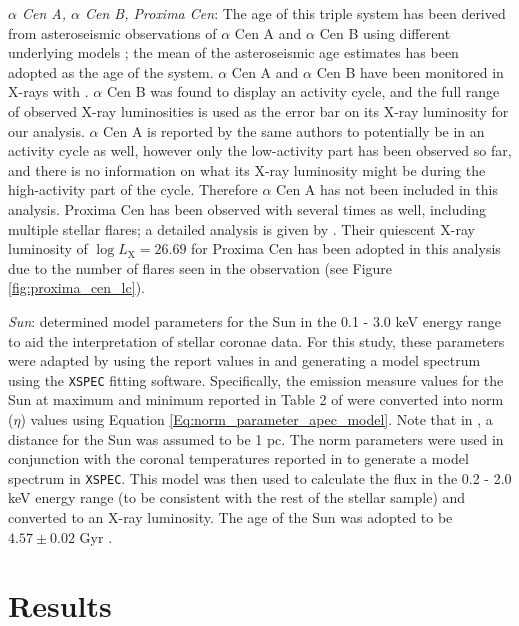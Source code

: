 \textit{$\alpha$ Cen A, $\alpha$ Cen B, Proxima Cen}: The age of this triple system has been derived from asteroseismic observations of $\alpha$ Cen A and $\alpha$ Cen B using different underlying models \citep{Miglio_Montalban_2005}; the mean of the asteroseismic age estimates has been adopted as the age of the system. $\alpha$ Cen A and $\alpha$ Cen B have been monitored in X-rays with \XMM \citep{Robrade_etal_2012}. $\alpha$ Cen B was found to display an activity cycle, and the full range of observed X-ray luminosities is used as the error bar on its X-ray luminosity for our analysis. $\alpha$ Cen A is reported by the same authors to potentially be in an activity cycle as well, however only the low-activity part has been observed so far, and there is no information on what its X-ray luminosity might be during the high-activity part of the cycle. Therefore $\alpha$ Cen A has not been included in this analysis. Proxima Cen has been observed with \XMM several times as well, including multiple stellar flares; a detailed analysis is given by \citet{Fuhrmeister_etal_2011}. Their quiescent X-ray luminosity of $\log L_{\mathrm{X}} = 26.69$ for Proxima Cen has been adopted in this analysis due to the number of flares seen in the observation (see Figure \ref{fig:proxima_cen_lc}).

\textit{Sun}: \citet{Peres_etal_2000} determined model parameters for the Sun in the 0.1 - 3.0 keV energy range to aid the interpretation of stellar coronae data. For this study, these parameters were adapted by using the report values in \citet{Peres_etal_2000} and generating a model spectrum using the \texttt{XSPEC} fitting software. Specifically, the emission measure values for the Sun at maximum and minimum reported in Table 2 of \citet{Peres_etal_2000} were converted into norm ($\eta$) values using Equation \ref{Eq:norm_parameter_apec_model}. Note that in \citet{Peres_etal_2000}, a distance for the Sun was assumed to be 1 pc. The norm parameters were used in conjunction with the coronal temperatures reported in \citet{Peres_etal_2000} to generate a model spectrum in \texttt{XSPEC}. This model was then used to calculate the flux in the 0.2 - 2.0 keV energy range (to be consistent with the rest of the stellar sample) and converted to an X-ray luminosity. The age of the Sun was adopted to be $4.57 \pm 0.02$ Gyr \citep{Bahcall_etal_1995}.

\section{Results}

